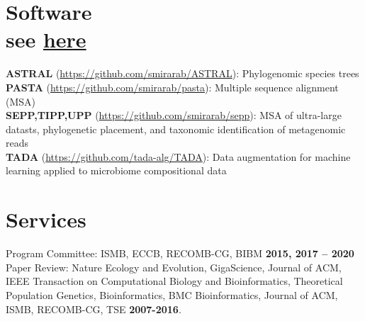 \documentclass[margin,line,letterpaper]{resume}
\begin{document}
\begin{resume}
\begin{small}
 \section{\mysidestyle Software\\ 
 see \href{http://eceweb.ucsd.edu/~smirarab/software.html}{here}}
\textbf{ASTRAL} (\url{https://github.com/smirarab/ASTRAL}):
Phylogenomic species trees\vspace{1mm}\\
\textbf{PASTA} (\url{https://github.com/smirarab/pasta}): 
Multiple sequence alignment (MSA)\vspace{1mm}\\
\textbf{SEPP,TIPP,UPP} (\url{https://github.com/smirarab/sepp}):
MSA of ultra-large datasts, phylogenetic placement, and taxonomic identification of metagenomic reads\\
\textbf{TADA} (\url{https://github.com/tada-alg/TADA}): Data augmentation for machine learning applied to microbiome compositional data\\

  \vspace{-2mm}
   \section{\mysidestyle Services}
    Program Committee: ISMB, ECCB, RECOMB-CG, BIBM  \hfill \textbf{2015, 2017 -- 2020 }\vspace{1mm}\\
    Paper Review:  Nature Ecology and Evolution, GigaScience, Journal of ACM, IEEE Transaction on Computational Biology and Bioinformatics, Theoretical Population Genetics, Bioinformatics, BMC Bioinformatics, Journal of ACM, ISMB, RECOMB-CG, TSE   \hfill \textbf{2007-2016}. %

    \renewcommand*{\thefootnote}{\fnsymbol{footnote}}

\end{small}
\end{resume}
\end{document}
